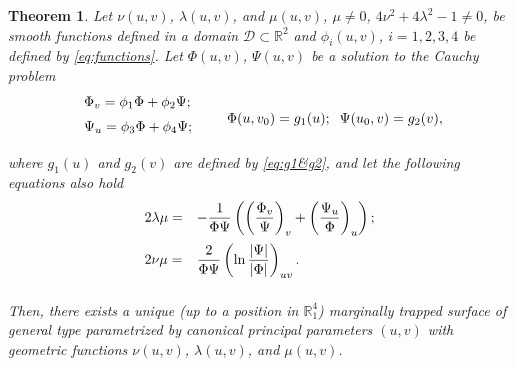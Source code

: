 \documentclass[12pt]{amsart}
\newcommand{\R}{\mathbb R}
\newtheorem{thm}{Theorem}[section]
\theoremstyle{definition}
\theoremstyle{remark}
\newcommand{\ds}{\displaystyle}
\numberwithin{equation}{section}
\begin{document}
\begin{thm} \label{eq:MainTheorem}
	Let $\nu(u,v)$, $\lambda(u,v)$, and  $\mu(u,v)$, $\mu \neq 0$, $4\nu^2+4\lambda^2-1 \neq 0$, be smooth functions defined in a domain ${\mathcal D} \subset \R^2$ and 
	$\phi_i(u,v)$, $i=1,2,3,4$ be defined by \eqref{eq:functions}. Let $\Phi(u,v)$, $\Psi(u,v)$ be a solution to the Cauchy problem
	\begin{equation*} 
		\begin{array}{l}
			\vspace{2mm}
			\ds\Phi_v=\phi_1\Phi+\phi_2\Psi;  \\ 
			\vspace{2mm}
			\ds\Psi_u   =\phi_3\Phi+\phi_4\Psi; \\
		\end{array}
		\qquad \Phi(u,v_0)=g_1(u); \;\; \Psi(u_0,v)=g_2(v),
	\end{equation*} 
	where $g_1(u)$ and $g_2(v)$ are defined by \eqref{eq:g1&g2}, and let the following equations also hold
	\begin{equation} \label{eq:4.3} 
		\begin{array}{ll}
			\vspace{2mm}
			\ds2\lambda\mu  = & \ds-\frac1{\Phi \Psi}
			\left( \left(\frac{\Phi_v}{\Psi}\right)_v+\left(\frac{\Psi_u}{\Phi}\right)_u \right);   \\
			\vspace{2mm}
			2\nu\mu  = &
			\ds \frac{2}{\Phi\Psi} \left(\ln\frac{|\Psi|}{|\Phi|} \right)_{uv}  .
		\end{array}
	\end{equation}
	
	
	Then, there exists a unique (up to a position in $\mathbb R^4_1$) marginally trapped surface of general type parametrized by canonical 
	principal parameters $(u,v)$ with geometric functions $\nu(u,v)$, $\lambda(u,v)$, and $\mu(u,v)$.
\end{thm}
\end{document}
